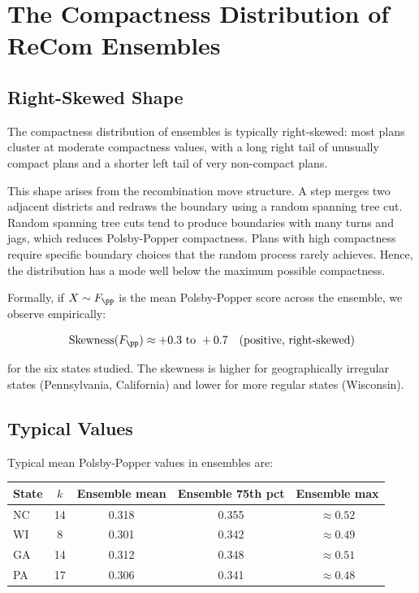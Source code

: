 \section{The Compactness Distribution of ReCom Ensembles}
\label{sec:distribution}

\subsection{Right-Skewed Shape}

The compactness distribution of \recom{} ensembles is typically right-skewed:
most plans cluster at moderate compactness values, with a long right tail of
unusually compact plans and a shorter left tail of very non-compact plans.

This shape arises from the recombination move structure.  A \recom{} step
merges two adjacent districts and redraws the boundary using a random spanning
tree cut.  Random spanning tree cuts tend to produce boundaries with many
turns and jags, which reduces Polsby-Popper compactness.  Plans with
high compactness require specific boundary choices that the random process
rarely achieves.  Hence, the distribution has a mode well below the maximum
possible compactness.

Formally, if $X \sim F_{\pp}$ is the mean Polsby-Popper score across the
ensemble, we observe empirically:

\begin{equation}
  \mathrm{Skewness}(F_{\pp}) \approx +0.3 \text{ to } +0.7
  \quad\text{(positive, right-skewed)}
  \label{eq:skew}
\end{equation}

for the six states studied.  The skewness is higher for geographically
irregular states (Pennsylvania, California) and lower for more regular states
(Wisconsin).

\subsection{Typical Values}

Typical mean Polsby-Popper values in \recom{} ensembles are:

\begin{center}
\begin{tabular}{lcccc}
\toprule
State & $k$ & Ensemble mean & Ensemble 75th pct & Ensemble max \\
\midrule
NC & 14 & 0.318 & 0.355 & $\approx 0.52$ \\
WI &  8 & 0.301 & 0.342 & $\approx 0.49$ \\
GA & 14 & 0.312 & 0.348 & $\approx 0.51$ \\
PA & 17 & 0.306 & 0.341 & $\approx 0.48$ \\
\bottomrule
\end{tabular}
\end{center}

